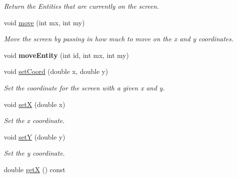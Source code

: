 \begin{DoxyCompactItemize}
\begin{DoxyCompactList}\small\item\em Return the Entities that are currently on the screen. \end{DoxyCompactList}\item 
void \hyperlink{classLevel_a9184b25173fbf468a63a633bd3510bd6}{move} (int mx, int my)\hypertarget{classLevel_a9184b25173fbf468a63a633bd3510bd6}{}\label{classLevel_a9184b25173fbf468a63a633bd3510bd6}

\begin{DoxyCompactList}\small\item\em Move the screen by passing in how much to move on the x and y coordinates. \end{DoxyCompactList}\item 
void {\bfseries move\+Entity} (int id, int mx, int my)\hypertarget{classLevel_af4788055ad02e14ea48958c9c871fee3}{}\label{classLevel_af4788055ad02e14ea48958c9c871fee3}

\item 
void \hyperlink{classLevel_a3ff79425060f959496d64aa052ef3cf6}{set\+Coord} (double x, double y)\hypertarget{classLevel_a3ff79425060f959496d64aa052ef3cf6}{}\label{classLevel_a3ff79425060f959496d64aa052ef3cf6}

\begin{DoxyCompactList}\small\item\em Set the coordinate for the screen with a given x and y. \end{DoxyCompactList}\item 
void \hyperlink{classLevel_a6212b3c03b3efc82cf69e642cc093959}{setX} (double x)\hypertarget{classLevel_a6212b3c03b3efc82cf69e642cc093959}{}\label{classLevel_a6212b3c03b3efc82cf69e642cc093959}

\begin{DoxyCompactList}\small\item\em Set the x coordinate. \end{DoxyCompactList}\item 
void \hyperlink{classLevel_a7c67443008f7e0f4b5d1630ff2dcf179}{setY} (double y)\hypertarget{classLevel_a7c67443008f7e0f4b5d1630ff2dcf179}{}\label{classLevel_a7c67443008f7e0f4b5d1630ff2dcf179}

\begin{DoxyCompactList}\small\item\em Set the y coordinate. \end{DoxyCompactList}\item 
double \hyperlink{classLevel_a6f5dca509c0e480d8a7b6b1d6b411375}{getX} () const \hypertarget{classLevel_a6f5dca509c0e480d8a7b6b1d6b411375}{}\label{classLevel_a6f5dca509c0e480d8a7b6b1d6b411375}


\end{DoxyCompactItemize}
